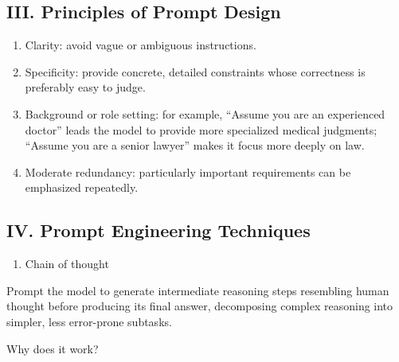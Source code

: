 \hypertarget{iii.-principles-of-prompt-design}{%
\subsection{III. Principles of Prompt Design}\label{iii.-principles-of-prompt-design}}

\begin{enumerate}
\def\labelenumi{\arabic{enumi}.}
\item
  Clarity: avoid vague or ambiguous instructions.
\item
  Specificity: provide concrete, detailed constraints whose correctness is preferably easy to judge.
\item
  Background or role setting: for example, ``Assume you are an experienced doctor'' leads the model to provide more specialized medical judgments; ``Assume you are a senior lawyer'' makes it focus more deeply on law.
\item
  Moderate redundancy: particularly important requirements can be emphasized repeatedly.
\end{enumerate}

\hypertarget{iv.-prompt-engineering-techniques}{%
\subsection{IV. Prompt Engineering Techniques}\label{iv.-prompt-engineering-techniques}}

\begin{enumerate}
\def\labelenumi{\arabic{enumi}.}
\tightlist
\item
  Chain of thought
\end{enumerate}

Prompt the model to generate intermediate reasoning steps resembling human thought before producing its final answer, decomposing complex reasoning into simpler, less error-prone subtasks.

Why does it work?


